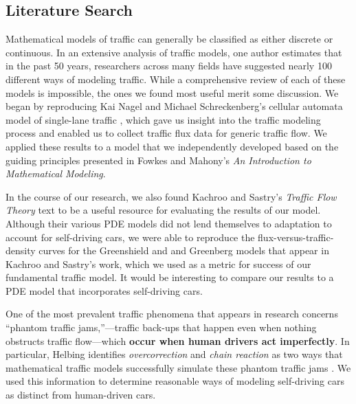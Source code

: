 \subsection{Literature Search}

Mathematical models of traffic can generally be classified as either discrete or continuous.  In an extensive analysis of traffic models, one author estimates  that in the past 50 years, researchers across many fields have suggested nearly 100 different ways of modeling traffic. \cite{Helbing2001TrafficSystems} While a comprehensive review of each of these models is impossible, the ones we found most useful merit some discussion.  We began by reproducing Kai Nagel and Michael Schreckenberg's cellular automata model of single-lane traffic \cite{Nagel1992ATraffic}, which gave us insight into the traffic modeling process and enabled us to collect traffic flux data for generic traffic flow. We applied these results to a model that we independently developed based on the guiding principles presented in Fowkes and Mahony's \textit{An Introduction to Mathematical Modeling}. 

In the course of our research, we also found Kachroo and Sastry's \textit{Traffic Flow Theory} text \cite{KachrooTrafficFramework} to be a useful resource for evaluating the results of our model.  Although their various PDE models did not lend themselves to adaptation to account for self-driving cars, we were able to reproduce the flux-versus-traffic-density curves for the Greenshield and and Greenberg models that appear in Kachroo and Sastry's work, which we used as a metric for success of our fundamental traffic model.  It would be interesting to compare our results to a PDE model that incorporates self-driving cars.

One of the most prevalent traffic phenomena that appears in research concerns ``phantom traffic jams,''---traffic back-ups that happen even when nothing obstructs traffic flow---which \textbf{occur when human drivers act imperfectly}.  In particular, Helbing identifies \textit{overcorrection} and \textit{chain reaction} as two ways that mathematical traffic models successfully simulate these phantom traffic jams \cite{Helbing2001TrafficSystems}.  We used this information to determine reasonable ways of modeling self-driving cars as distinct from human-driven cars.

